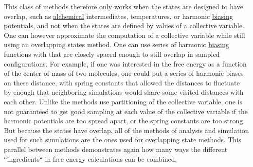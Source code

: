 \documentclass[9pt,review]{livecoms}
\begin{document}
This class of methods therefore only works when the states are designed to have overlap, such as \hyperlink{ref:Alchemical} {alchemical} intermediates, temperatures, or harmonic \hyperlink{ref:biasingE} {biasing} potentials, and not when the states are defined by values of a collective variable. One can however approximate the computation of a collective variable while still using an overlapping states method.  One can use series of harmonic \hyperlink{ref:biasingE} {biasing} functions with that are closely spaced enough to still overlap in sampled configurations. For example, if one was interested in the free energy as a function of the center of mass of two molecules, one could put a series of harmonic biases on these distance, with spring constants that allowed the distances to fluctuate by enough that neighboring simulations would share some visited distances with each other. Unlike the methods use partitioning of the collective variable, one is not guaranteed to get good sampling at each value of the collective variable if the harmonic potentials are too spread apart, or the spring constants are too strong. But because the states have overlap, all of the methods of analysis and simulation used for such simulations are the ones used for overlapping state methods.  This parallel between methods demonstrates again how many ways the different ``ingredients`` in free energy calculations can be combined.
\end{document}

